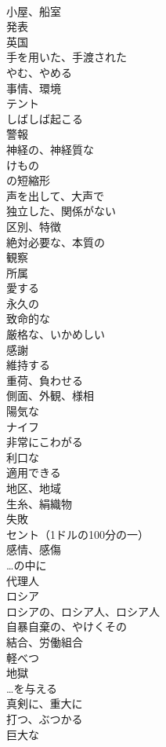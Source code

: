 \documentclass[8pt]{extreport}
\begin{document}
\begin{CJK}{UTF8}{min}
\\	小屋、船室
\\	発表
\\	英国
\\	手を用いた、手渡された
\\	やむ、やめる
\\	事情、環境
\\	テント
\\	しばしば起こる
\\	警報
\\	神経の、神経質な
\\	けもの
\\	の短縮形
\\	声を出して、大声で
\\	独立した、関係がない
\\	区別、特徴
\\	絶対必要な、本質の
\\	観察
\\	所属
\\	愛する
\\	永久の
\\	致命的な
\\	厳格な、いかめしい
\\	感謝
\\	維持する
\\	重荷、負わせる
\\	側面、外観、様相
\\	陽気な
\\	ナイフ
\\	非常にこわがる
\\	利口な
\\	適用できる
\\	地区、地域
\\	生糸、絹織物
\\	失敗
\\	セント（1ドルの100分の一）
\\	感情、感傷
\\	…の中に
\\	代理人
\\	ロシア
\\	ロシアの、ロシア人、ロシア人
\\	自暴自棄の、やけくその
\\	結合、労働組合
\\	軽べつ
\\	地獄
\\	…を与える
\\	真剣に、重大に
\\	打つ、ぶつかる
\\	巨大な

\end{CJK}
\end{document}

